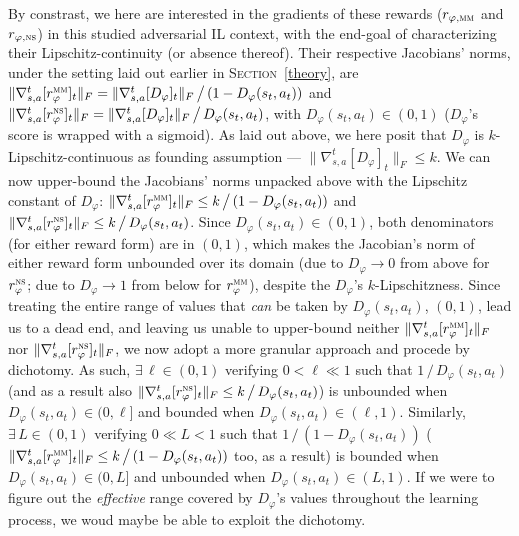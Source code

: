 By constrast, we here are interested in the gradients of these rewards ($r_{\varphi, \textsc{mm}}$
and $r_{\varphi, \textsc{ns}}$)
in this studied adversarial IL context,
with the end-goal of characterizing their Lipschitz-continuity (or absence thereof).
Their respective Jacobians' norms, under the setting laid out earlier in \textsc{Section}~\ref{theory}, are
$\lVert \nabla_{s,a}^t[r_\varphi^\textsc{mm}]_t \rVert _F
= \lVert \nabla_{s,a}^t[D_\varphi]_t \rVert _F \, \big/ \, (1 - D_\varphi(s_t,a_t))$ and
$\lVert \nabla_{s,a}^t[r_\varphi^\textsc{ns}]_t \rVert _F
= \lVert \nabla_{s,a}^t[D_\varphi]_t \rVert _F \, \big/ \, D_\varphi(s_t,a_t)$, with $D_\varphi(s_t,a_t) \in (0,1)$
($D_\varphi$'s score is wrapped with a sigmoid).
As laid out above, we here posit that $D_\varphi$ is $k$-Lipschitz-continuous as founding assumption ---
$\lVert \nabla_{s,a}^t[D_\varphi]_t \rVert _F \leq k$. We can now upper-bound the Jacobians' norms
unpacked above with the Lipschitz constant of $D_\varphi$:
$\lVert \nabla_{s,a}^t[r_\varphi^\textsc{mm}]_t \rVert _F
\leq k \, \big/ \, (1 - D_\varphi(s_t,a_t))$ and
$\lVert \nabla_{s,a}^t[r_\varphi^\textsc{ns}]_t \rVert _F
\leq k \, \big/ \, D_\varphi(s_t,a_t)$.
Since $D_\varphi(s_t,a_t) \in (0,1)$, both denominators (for either reward form) are in $(0,1)$,
which makes the Jacobian's norm of either reward form unbounded
over its domain (due to $D_\varphi \to 0$ from above for $r_\varphi^\textsc{ns}$;
due to $D_\varphi \to 1$ from below for $r_\varphi^\textsc{mm}$),
despite the $D_\varphi$'s $k$-Lipschitzness.
Since treating the entire range of values that \emph{can} be taken by $D_\varphi(s_t,a_t)$, $(0,1)$,
lead us to a dead end, and leaving us unable to upper-bound neither
$\lVert \nabla_{s,a}^t[r_\varphi^\textsc{mm}]_t \rVert _F$ nor
$\lVert \nabla_{s,a}^t[r_\varphi^\textsc{ns}]_t \rVert _F$,
we now adopt a more granular approach and procede by dichotomy.
As such, $\exists \, \ell \in (0,1)$ verifying $0 < \ell \ll 1$
such that $1 \, \big/ \, D_\varphi(s_t,a_t)$
\big(and as a result also $\lVert \nabla_{s,a}^t[r_\varphi^\textsc{ns}]_t \rVert _F
\leq k \, \big/ \, D_\varphi(s_t,a_t)$\big)
is unbounded when $D_\varphi(s_t,a_t) \in (0,\ell]$ and bounded when $D_\varphi(s_t,a_t) \in (\ell,1)$.
Similarly, $\exists \, L \in (0,1)$ verifying $0 \ll L < 1$
such that $1 \, \big/ \, (1 - D_\varphi(s_t,a_t))$
\big($\lVert \nabla_{s,a}^t[r_\varphi^\textsc{mm}]_t \rVert _F
\leq k \, \big/ \, (1 - D_\varphi(s_t,a_t))$ too, as a result\big)
is bounded when $D_\varphi(s_t,a_t) \in (0,L]$ and unbounded when $D_\varphi(s_t,a_t) \in (L,1)$.
If we were to figure out the \emph{effective} range covered by $D_\varphi$'s values throughout the learning process,
we woud maybe be able to exploit the dichotomy.

